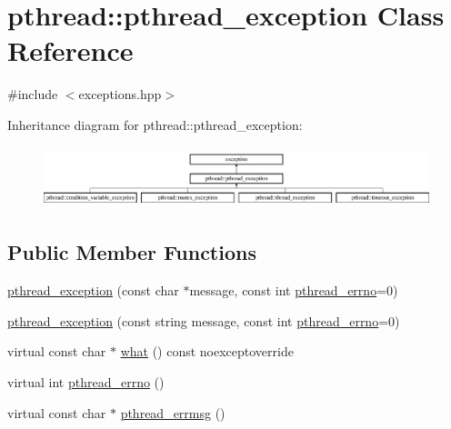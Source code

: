 \hypertarget{classpthread_1_1pthread__exception}{\section{pthread\+:\+:pthread\+\_\+exception Class Reference}
\label{classpthread_1_1pthread__exception}
}


{\ttfamily \#include $<$exceptions.\+hpp$>$}

Inheritance diagram for pthread\+:\+:pthread\+\_\+exception\+:\begin{figure}[H]
\begin{center}
\leavevmode
\includegraphics[height=1.794872cm]{classpthread_1_1pthread__exception}
\end{center}
\end{figure}
\subsection*{Public Member Functions}
\begin{DoxyCompactItemize}
\item 
\hyperlink{classpthread_1_1pthread__exception_aa3f5550d956b649cb554092595d7eff0}{pthread\+\_\+exception} (const char $\ast$message, const int \hyperlink{classpthread_1_1pthread__exception_a4a869173054faca1945ac1a7729082d6}{pthread\+\_\+errno}=0)
\item 
\hyperlink{classpthread_1_1pthread__exception_a157d4379b6eddcc82ca504534c51abe6}{pthread\+\_\+exception} (const string message, const int \hyperlink{classpthread_1_1pthread__exception_a4a869173054faca1945ac1a7729082d6}{pthread\+\_\+errno}=0)
\item 
virtual const char $\ast$ \hyperlink{classpthread_1_1pthread__exception_ae54eed6aa72bac1c503554ddd857e466}{what} () const noexceptoverride
\item 
virtual int \hyperlink{classpthread_1_1pthread__exception_a4a869173054faca1945ac1a7729082d6}{pthread\+\_\+errno} ()
\item 
virtual const char $\ast$ \hyperlink{classpthread_1_1pthread__exception_afc17488e8f6160865f1beb4d6fc20d2a}{pthread\+\_\+errmsg} ()
\end{DoxyCompactItemize}


